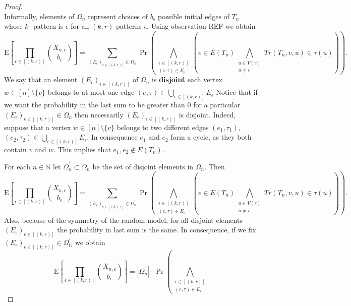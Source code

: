 \documentclass[12pt,notitlepage,a4paper]{article}
\theoremstyle{definition}
\newcommand{\N}{\mathbb{N}}
\begin{document}
\begin{proof}
\[		\]
		Informally, elements of $\Omega_n$ represent choices of 
		$b_\epsilon$ possible initial edges of $T_n$ whose $k$-
		pattern is $\epsilon$ for all $(k,r)$-patterns $\epsilon$. 	
		Using observation REF we obtain
		\[
		\mathrm{E}
		\left[
		\prod_{\epsilon\in [(k,r)]} \binom{X_{n,\epsilon}}{b_\epsilon}	
		\right]
		= 
		\sum_{
		(E_\epsilon)_{\epsilon\in [(k,r)]}
		\in \Omega_n}
		\Pr\left(
		\bigwedge_{\substack{
		\epsilon\in [(k,r)]\\
		(e, \tau)\in E_{\epsilon}
		}} \left(
		e\in E(T_n) \bigwedge_{\substack{
		u\in V(e)\\
		u\neq v}} Tr(T_n,v,u)\in \tau(u)		
		\right)
		\right). 		
		\]
		We say that an element $(E_\epsilon)_{\epsilon\in [(k,r)]}$
		of $\Omega_n$ is \textbf{disjoint} each vertex 
		$w\in [n]\setminus\{v\}$ belongs to at most one edge 
		$(e,\tau)\in\bigcup_{\epsilon\in [(k,r)]} E_\epsilon$
		Notice that if we want the probability in the last sum to be greater 
		than $0$ for a particular $(E_\epsilon)_{\epsilon\in [(k,r)]}
		\in \Omega_n$ then necessarily $(E_\epsilon)_{\epsilon\in [(k,r)]}$
		is disjoint. 
		Indeed, suppose that a vertex $w\in [n]\setminus \{v\}$ belongs to two different 
		edges $(e_1, \tau_1),$ $(e_2,\tau_2)\in \bigcup_{\epsilon\in [(k,r)]} E_\epsilon$. 
		In consequence $e_1$ and $e_2$ form a cycle, as they 
		both contain $v$ and $w$. This implies that $e_1, e_2 \notin E(T_n)$.
		\par
		For each $n\in \N$ let $\Omega_n^\prime\subset \Omega_n$ be the set
		of disjoint elements in $\Omega_n$. Then
		\[
		\mathrm{E}
		\left[
		\prod_{\epsilon\in [(k,r)]} \binom{X_{n,\epsilon}}{b_\epsilon}	
		\right]
		= 
		\sum_{
			(E_\epsilon)_{\epsilon\in [(k,r)]}
			\in \Omega_n^\prime}
		\Pr\left(
		\bigwedge_{\substack{
				\epsilon\in [(k,r)]\\
				(e, \tau)\in E_{\epsilon}
		}} \left(
		e\in E(T_n) \bigwedge_{\substack{
				u\in V(e)\\
				u\neq v}} Tr(T_n,v,u)\in \tau(u)		
		\right)
		\right). 		
		\] 
		Also, because of the symmetry of the random model, 
		for all disjoint elements 
		$(E_\epsilon)_{\epsilon\in [(k,r)]}$ the probability 
		in last sum is the same. In consequence, if we fix
		$(E_\epsilon)_{\epsilon\in [(k,r)]}\in \Omega^\prime_\N$
		we obtain
		\[
		\mathrm{E}
		\left[
		\prod_{\epsilon\in [(k,r)]} \binom{X_{n,\epsilon}}{b_\epsilon}	
		\right]
		= 
		|\Omega_n^\prime|\cdot
		\Pr\left(
		\bigwedge_{\substack{
				\epsilon\in [(k,r)]\\
				(e, \tau)\in E_{\epsilon}
}}\]
\end{proof}
\end{document}
